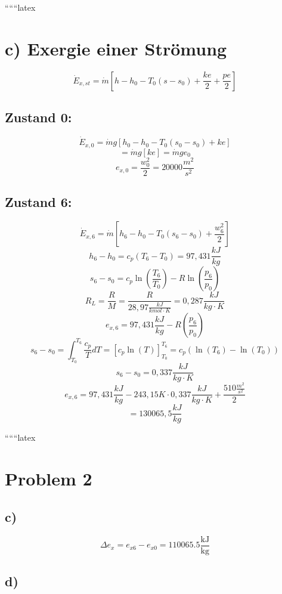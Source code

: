``````latex


\section*{c) Exergie einer Strömung}

\[
\dot{E}_{x,st} = \dot{m} \left[ h - h_0 - T_0 (s - s_0) + \frac{ke}{2} + \frac{pe}{2} \right]
\]

\subsection*{Zustand 0:}
\[
\dot{E}_{x,0} = \dot{m} g \left[ h_0 - h_0 - T_0 (s_0 - s_0) + ke \right]
\]
\[
= \dot{m} g \left[ ke \right] = \dot{m} g e_0
\]
\[
e_{x,0} = \frac{w_0^2}{2} = 20000 \frac{m^2}{s^2}
\]

\subsection*{Zustand 6:}
\[
\dot{E}_{x,6} = \dot{m} \left[ h_6 - h_0 - T_0 (s_6 - s_0) + \frac{w_6^2}{2} \right]
\]
\[
h_6 - h_0 = c_p (T_6 - T_0) = 97,431 \frac{kJ}{kg}
\]
\[
s_6 - s_0 = c_p \ln \left( \frac{T_6}{T_0} \right) - R \ln \left( \frac{p_6}{p_0} \right)
\]
\[
R_L = \frac{R}{M} = \frac{R}{28,97 \frac{kJ}{kmol \cdot K}} = 0,287 \frac{kJ}{kg \cdot K}
\]
\[
e_{x,6} = 97,431 \frac{kJ}{kg} - R \left( \frac{p_6}{p_0} \right)
\]
\[
s_6 - s_0 = \int_{T_0}^{T_6} \frac{c_p}{T} dT = \left[ c_p \ln (T) \right]_{T_0}^{T_6} = c_p \left( \ln (T_6) - \ln (T_0) \right)
\]
\[
s_6 - s_0 = 0,337 \frac{kJ}{kg \cdot K}
\]
\[
e_{x,6} = 97,431 \frac{kJ}{kg} - 243,15 K \cdot 0,337 \frac{kJ}{kg \cdot K} + \frac{510 \frac{m^2}{s^2}}{2}
\]
\[
= 130065,5 \frac{kJ}{kg}
\]

``````latex


\section*{Problem 2}

\subsection*{c)}

\[
\Delta e_x = e_{x6} - e_{x0} = 110065.5 \frac{\text{kJ}}{\text{kg}}
\]

\subsection*{d)}


